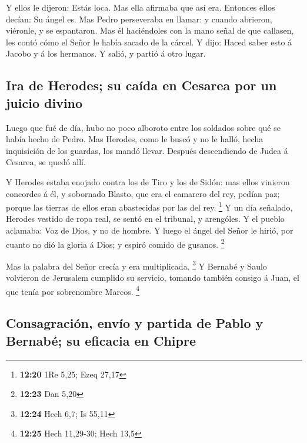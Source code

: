  Y ellos le dijeron: Estás loca. Mas ella afirmaba que
así era. Entonces ellos decían: Su ángel es.  Mas Pedro
perseveraba en llamar: y cuando abrieron, viéronle, y se espantaron.
 Mas él haciéndoles con la mano señal de que callasen,
les contó cómo el Señor le había sacado de la cárcel. Y dijo: Haced
saber esto á Jacobo y á los hermanos. Y salió, y partió á otro lugar.

\hypertarget{ira-de-herodes-su-cauxedda-en-cesarea-por-un-juicio-divino}{%
\subsection{Ira de Herodes; su caída en Cesarea por un juicio
divino}\label{ira-de-herodes-su-cauxedda-en-cesarea-por-un-juicio-divino}}

 Luego que fué de día, hubo no poco alboroto entre los
soldados sobre qué se había hecho de Pedro.  Mas Herodes,
como le buscó y no le halló, hecha inquisición de los guardas, los mandó
llevar. Después descendiendo de Judea á Cesarea, se quedó allí.

 Y Herodes estaba enojado contra los de Tiro y los de
Sidón: mas ellos vinieron concordes á él, y sobornado Blasto, que era el
camarero del rey, pedían paz; porque las tierras de ellos eran
abastecidas por las del rey. \footnote{\textbf{12:20} 1Re 5,25; Ezeq
  27,17}  Y un día señalado, Herodes vestido de ropa
real, se sentó en el tribunal, y arengóles.  Y el pueblo
aclamaba: Voz de Dios, y no de hombre.  Y luego el ángel
del Señor le hirió, por cuanto no dió la gloria á Dios; y espiró comido
de gusanos. \footnote{\textbf{12:23} Dan 5,20}

 Mas la palabra del Señor crecía y era multiplicada.
\footnote{\textbf{12:24} Hech 6,7; Is 55,11}  Y Bernabé y
Saulo volvieron de Jerusalem cumplido su servicio, tomando también
consigo á Juan, el que tenía por sobrenombre Marcos. \footnote{\textbf{12:25}
  Hech 11,29-30; Hech 13,5}

\hypertarget{consagraciuxf3n-envuxedo-y-partida-de-pablo-y-bernabuxe9-su-eficacia-en-chipre}{%
\subsection{Consagración, envío y partida de Pablo y Bernabé; su
eficacia en
Chipre}\label{consagraciuxf3n-envuxedo-y-partida-de-pablo-y-bernabuxe9-su-eficacia-en-chipre}}

